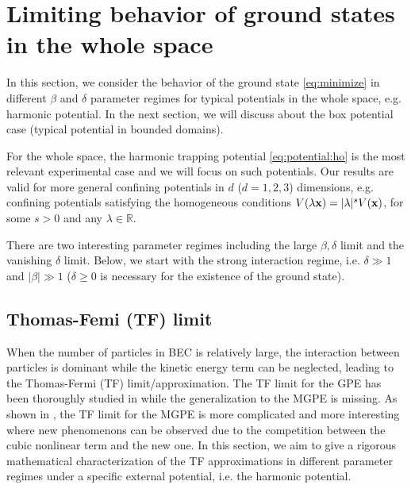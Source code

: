 \documentclass{elsarticle}
\newcommand{\bx}{{\bf x} }
\begin{document}
\section{Limiting behavior of ground states in the whole space}\label{subsec:ws}
In this section, we consider the behavior of the ground state \eqref{eq:minimize} in different $\beta$ and $\delta$ parameter regimes for typical potentials in the whole space, e.g. harmonic potential.
In the next section, we will discuss about the box potential case (typical potential in bounded domains).

For the whole space, the harmonic trapping potential  \eqref{eq:potential:ho}   is the most relevant experimental case and we will focus on such potentials.
Our results are valid for more general confining potentials
in $d$ ($d=1,2,3$) dimensions, e.g. confining potentials satisfying the homogeneous conditions $V(\lambda\bx)=|\lambda|^sV(\bx)$, for some $s>0$ and any $\lambda\in\mathbb{R}$.

There are two interesting parameter regimes including the large $\beta,\delta$ limit and the vanishing $\delta$ limit. Below, we start with the strong interaction regime, i.e. $\delta\gg1$ and $|\beta|\gg1$ ($\delta\ge0$ is necessary for the existence of the ground state).
\subsection{Thomas-Femi (TF) limit}
When the number of particles in BEC is relatively large, the interaction between particles is dominant while the kinetic energy term can be neglected, leading to the Thomas-Fermi (TF) limit/approximation. The TF limit for the GPE has been thoroughly studied in \cite{Bao2013,LiebL,Lie} while the generalization to the MGPE is missing. As shown in \cite{Ruan}, the TF limit for the MGPE is more complicated and more interesting where new phenomenons can be observed due to the competition between the cubic nonlinear term and the new one.
In this section, we aim to give a rigorous mathematical characterization of the TF approximations in different parameter regimes under a specific external potential, i.e. the harmonic potential.
\end{document}
